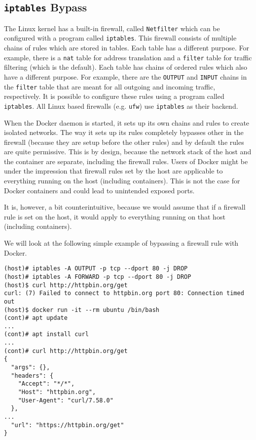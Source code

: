 \subsection{\texorpdfstring{\lstinline{iptables}}{iptables} Bypass}\label{subsection:iptables}
The Linux kernel has a built-in firewall, called \lstinline{Netfilter} which can be configured with a program called \lstinline{iptables}. This firewall consists of multiple chains of rules which are stored in tables. Each table has a different purpose. For example, there is a \lstinline{nat} table for address translation and a \lstinline{filter} table for traffic filtering (which is the default).
Each table has chains of ordered rules which also have a different purpose. For example, there are the \lstinline{OUTPUT} and \lstinline{INPUT} chains in the \lstinline{filter} table that are meant for all outgoing and incoming traffic, respectively.
It is possible to configure these rules using a program called \lstinline{iptables}. All Linux based firewalls (e.g. \lstinline{ufw}) use \lstinline{iptables} as their backend.

\medskip

When the Docker daemon is started, it sets up its own chains and rules to create isolated networks. The way it sets up its rules completely bypasses other in the firewall (because they are setup before the other rules) and by default the rules are quite permissive. This is by design, because the network stack of the host and the container are separate, including the firewall rules. Users of Docker might be under the impression that firewall rules set by the host are applicable to everything running on the host (including containers). This is not the case for Docker containers and could lead to unintended exposed ports.

It is, however, a bit counterintuitive, because we would assume that if a firewall rule is set on the host, it would apply to everything running on that host (including containers).

\medskip

We will look at the following simple example of bypassing a firewall rule with Docker.

\begin{lstlisting}[caption={Bypass \lstinline{iptables} firewall rules using Docker.},captionpos=b,label={listing:iptables-bypass}]
(host)# iptables -A OUTPUT -p tcp --dport 80 -j DROP
(host)# iptables -A FORWARD -p tcp --dport 80 -j DROP
(host)$ curl http://httpbin.org/get
curl: (7) Failed to connect to httpbin.org port 80: Connection timed out
(host)$ docker run -it --rm ubuntu /bin/bash
(cont)# apt update
...
(cont)# apt install curl
...
(cont)# curl http://httpbin.org/get
{
  "args": {},
  "headers": {
    "Accept": "*/*",
    "Host": "httpbin.org",
    "User-Agent": "curl/7.58.0"
  },
...
  "url": "https://httpbin.org/get"
}
\end{lstlisting}

